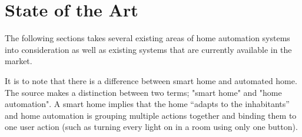 \section{State of the Art}\label{sec:sota}
The following sections takes several existing areas of home automation systems into consideration as well as existing systems that are currently available in the market.

It is to note that there is a difference between smart home and automated home. The source \cite{HAInterviews} makes a distinction between two terms; "smart home" and "home automation". A smart home implies that the home \enquote{adapts to the inhabitants}\cite{HAInterviews} and home automation is grouping multiple actions together and binding them to one user action (such as turning every light on in a room using only one button).




